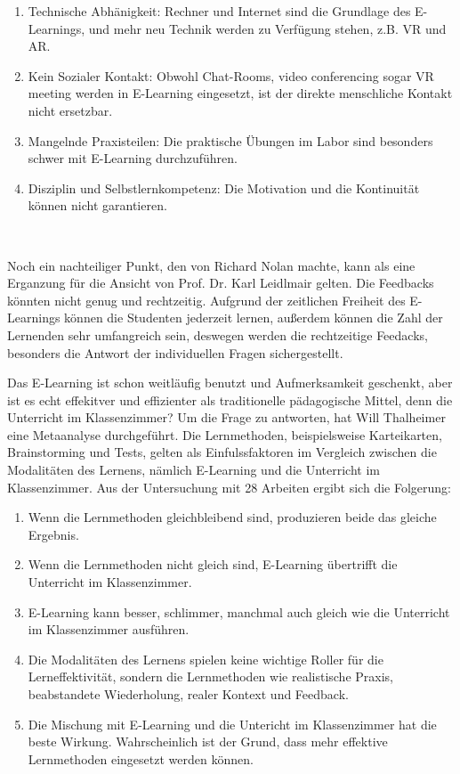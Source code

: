 \begin{enumerate}
\item Technische Abhänigkeit: Rechner und Internet sind die Grundlage des E-Learnings, und mehr neu Technik werden zu Verfügung stehen, z.B. VR und AR.
\item Kein Sozialer Kontakt: Obwohl Chat-Rooms, video conferencing sogar VR meeting werden in E-Learning eingesetzt, ist der direkte menschliche Kontakt nicht ersetzbar.
\item Mangelnde Praxisteilen: Die praktische Übungen im Labor sind besonders schwer mit E-Learning durchzuführen.
\item Disziplin und Selbstlernkompetenz: Die Motivation und die Kontinuität können nicht garantieren.
\end{enumerate}\

Noch ein nachteiliger Punkt, den von Richard Nolan\citep{5} machte, kann als eine Erganzung für die Ansicht von Prof. Dr. Karl Leidlmair gelten. Die Feedbacks könnten nicht genug und rechtzeitig. Aufgrund der zeitlichen Freiheit des E-Learnings können die Studenten jederzeit lernen, außerdem können die Zahl der Lernenden sehr umfangreich sein, deswegen werden die rechtzeitige Feedacks, besonders die Antwort der individuellen Fragen sichergestellt.

Das E-Learning ist schon weitläufig benutzt und Aufmerksamkeit geschenkt, aber ist es echt effekitver und effizienter als traditionelle pädagogische Mittel, denn die Unterricht im Klassenzimmer? Um die Frage zu antworten, hat Will Thalheimer\citep{8} eine Metaanalyse durchgeführt. Die Lernmethoden, beispielsweise Karteikarten, Brainstorming und Tests, gelten als Einfulssfaktoren im Vergleich zwischen die Modalitäten des Lernens, nämlich E-Learning und die Unterricht im Klassenzimmer. Aus der Untersuchung mit 28 Arbeiten ergibt sich die Folgerung:

\begin{enumerate}
\item Wenn die Lernmethoden gleichbleibend sind, produzieren beide das gleiche Ergebnis.
\item Wenn die Lernmethoden nicht gleich sind, E-Learning übertrifft die Unterricht im Klassenzimmer.
\item E-Learning kann besser, schlimmer, manchmal auch gleich wie die Unterricht im Klassenzimmer  ausführen.
\item Die Modalitäten des Lernens spielen keine wichtige Roller für die Lerneffektivität, sondern die Lernmethoden wie realistische Praxis, beabstandete Wiederholung, realer Kontext und Feedback.
\item Die Mischung mit E-Learning und die Untericht im Klassenzimmer hat die beste Wirkung. Wahrscheinlich ist der Grund, dass mehr effektive Lernmethoden eingesetzt werden können. 
\end{enumerate}\

